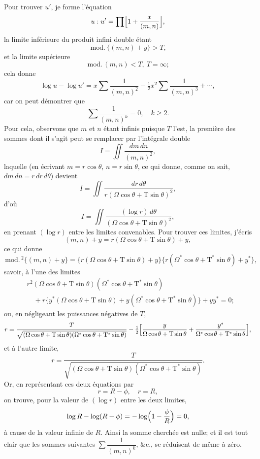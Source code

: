 \documentclass[11pt,a4paper]{article}
\providecommand{\md}{\,\mathrm{mod.}\,}
\begin{document}
Pour trouver $u'$, je forme l'\'equation
\[
u : u' = \prod\Bigl[1 + \frac{x}{(m, n)}\Bigr],
\]
la limite inf\'erieure du produit infini double \'etant
\[ \md\{(m, n) + y\} > T, \]
et la limite sup\'erieure
\[ \md(m, n) < T,\ T = \infty; \]
cela donne
\[
\log u - \log u' = x \sum \frac{1}{(m, n)^2} - \tfrac{1}{2} x^2 \sum \frac{1}{(m, n)^3} + \cdots,
\]
car on peut d\'emontrer que
\[
\sum \frac{1}{(m, n)^k} = 0,\quad k \geq 2.
\]
Pour cela, observons que $m$ et $n$ \'etant infinis puisque $T$ l'est, la premi\`ere des sommes dont il s'agit peut se remplacer par l'int\'egrale double
\[
I = \iint \frac{dm\,dn}{(m, n)^2},
\]
laquelle (en \'ecrivant $m = r \cos\theta$, $n = r \sin\theta$, ce qui donne, comme on sait, $dm\,dn = r\,dr\,d\theta$) devient
\[
I = \iint \frac{dr\,d\theta}{r(\Omega \cos\theta + \mathrm{T}\sin\theta)^2},
\]
d'o\`u
\[
I = \iint \frac{(\log r)\,d\theta}{(\Omega \cos\theta + \mathrm{T}\sin\theta)^2},
\]
en prenant $(\log r)$ entre les limites convenables. Pour trouver ces limites, j'\'ecris
\[
(m, n) + y = r (\Omega \cos\theta + \mathrm{T}\sin\theta) + y,
\]
ce qui donne
\[
\md^2\{(m, n) + y\} = \bigl\{r(\Omega \cos\theta + \mathrm{T}\sin\theta) + y\bigr\}\bigl\{r(\Omega^* \cos\theta + \mathrm{T}^*\sin\theta) + y^*\bigr\},
\]
savoir, \`a l'une des limites
\begin{align*}
& r^2 (\Omega \cos\theta + \mathrm{T}\sin\theta)(\Omega^* \cos\theta + \mathrm{T}^*\sin\theta)\\
&\quad + r\bigl\{y^*(\Omega \cos\theta + \mathrm{T}\sin\theta) + y(\Omega^* \cos\theta + \mathrm{T}^*\sin\theta)\bigr\} + y y^* = 0;
\end{align*}
ou, en n\'egligeant les puissances n\'egatives de $T$,
\[
r = \frac{T}{\sqrt{(\Omega \cos\theta + \mathrm{T}\sin\theta)(\Omega^* \cos\theta + \mathrm{T}^*\sin\theta)}}
- \tfrac{1}{2}\Bigl[\frac{y}{\Omega \cos\theta + \mathrm{T}\sin\theta} + \frac{y^*}{\Omega^* \cos\theta + \mathrm{T}^*\sin\theta}\Bigr],
\]
et \`a l'autre limite,
\[
r = \frac{T}{\sqrt{(\Omega \cos\theta + \mathrm{T}\sin\theta)(\Omega^* \cos\theta + \mathrm{T}^*\sin\theta)}}.
\]
Or, en repr\'esentant ces deux \'equations par
\[ r = R - \phi,\quad r = R, \]
on trouve, pour la valeur de $(\log r)$ entre les deux limites,
\[
\log R - \log (R - \phi) = -\log\Bigl(1 - \frac{\phi}{R}\Bigr) = 0,
\]
\`a cause de la valeur infinie de $R$. Ainsi la somme cherch\'ee est nulle; et il est tout clair que les sommes suivantes $\sum \dfrac{1}{(m, n)^k}$, \&c., se r\'eduisent de m\^eme \`a z\'ero.

\medskip
\end{document}
